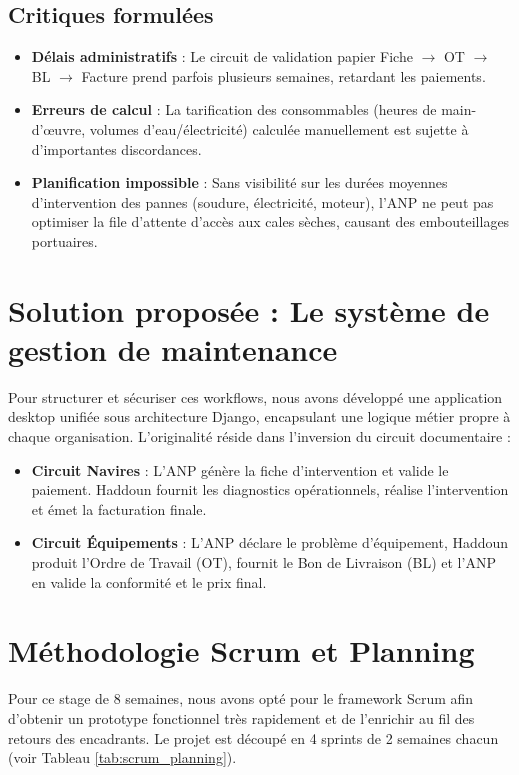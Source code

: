 \documentclass[12pt,a4paper,oneside]{report}
\begin{document}
\subsection{Critiques formulées}
\begin{itemize}
    \item \textbf{Délais administratifs} : Le circuit de validation papier Fiche $\rightarrow$ OT $\rightarrow$ BL $\rightarrow$ Facture prend parfois plusieurs semaines, retardant les paiements.
    \item \textbf{Erreurs de calcul} : La tarification des consommables (heures de main-d'œuvre, volumes d'eau/électricité) calculée manuellement est sujette à d'importantes discordances.
    \item \textbf{Planification impossible} : Sans visibilité sur les durées moyennes d'intervention des pannes (soudure, électricité, moteur), l'ANP ne peut pas optimiser la file d'attente d'accès aux cales sèches, causant des embouteillages portuaires.
\end{itemize}

\section{Solution proposée : Le système de gestion de maintenance}
Pour structurer et sécuriser ces workflows, nous avons développé une application desktop unifiée sous architecture Django, encapsulant une logique métier propre à chaque organisation. L'originalité réside dans l'inversion du circuit documentaire :
\begin{itemize}
    \item \textbf{Circuit Navires} : L'ANP génère la fiche d'intervention et valide le paiement. Haddoun fournit les diagnostics opérationnels, réalise l'intervention et émet la facturation finale.
    \item \textbf{Circuit Équipements} : L'ANP déclare le problème d'équipement, Haddoun produit l'Ordre de Travail (OT), fournit le Bon de Livraison (BL) et l'ANP en valide la conformité et le prix final.
\end{itemize}

\section{Méthodologie Scrum et Planning}
Pour ce stage de 8 semaines, nous avons opté pour le framework Scrum afin d'obtenir un prototype fonctionnel très rapidement et de l'enrichir au fil des retours des encadrants. Le projet est découpé en 4 sprints de 2 semaines chacun (voir Tableau \ref{tab:scrum_planning}).
\end{document}
